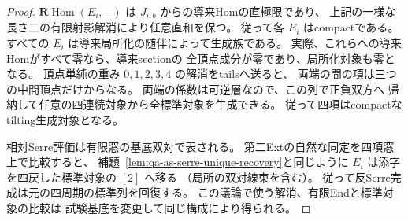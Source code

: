 \begin{proof}
$\mathbf R\operatorname{Hom}(E_i,-)$ は
$J_{i,b}$ からの導来Homの直極限であり、
上記の一様な長さ二の有限射影解消により任意直和を保つ。
従って各 $E_i$ はcompactである。
すべての $E_i$ は導来局所化の随伴によって生成族である。
実際、これらへの導来Homがすべて零なら、導来sectionの
全頂点成分が零であり、局所化対象も零となる。
頂点単純の重み $0,1,2,3,4$ の解消をtailsへ送ると、
両端の間の項は三つの中間頂点だけからなる。
両端の係数は可逆層なので、この列で正負双方へ
帰納して任意の四連続対象から全標準対象を生成できる。
従って四項はcompactなtilting生成対象となる。

相対Serre評価は有限窓の基底双対で表される。
第二Extの自然な同定を四項窓上で比較すると、
補題~\ref{lem:qa-as-serre-unique-recovery}と同じように
$E_i$ は添字を四戻した標準対象の $[2]$ へ移る
（局所の双対線束を含む）。
従って反Serre完成は元の四周期の標準列を回復する。
この議論で使う解消、有限Endと標準対象の比較は
試験基底を変更して同じ構成により得られる。
\end{proof}

